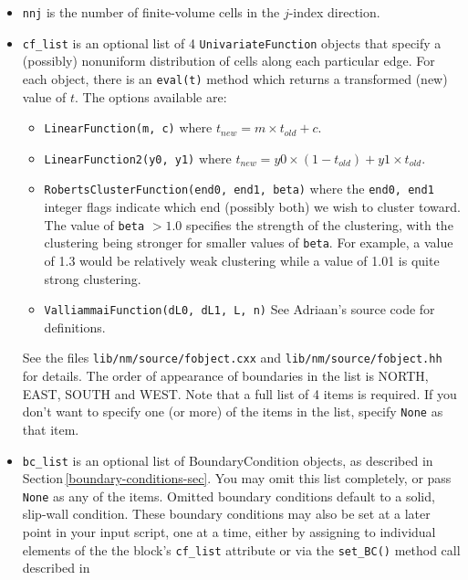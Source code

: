 \begin{itemize}
\item \texttt{nnj} is the number of finite-volume cells in the $j$-index direction.
\item \texttt{cf\_list} \label{cflist-item} is an optional list of 4 \texttt{UnivariateFunction} objects
  that specify a (possibly) nonuniform distribution of cells along each particular edge.
  For each object, there is an \texttt{eval(t)} method which returns a transformed (new) value of $t$.
  The options available are:
  \begin{itemize}
    \item \texttt{LinearFunction(m, c)}
      where $t_{new} = m \times t_{old} + c$.
    \item \texttt{LinearFunction2(y0, y1)}
      where $t_{new} = y0 \times (1-t_{old}) + y1 \times t_{old}$.
    \item \texttt{RobertsClusterFunction(end0, end1, beta)}
      where the \texttt{end0, end1} integer flags indicate which end (possibly both) we wish to cluster toward.
      The value of \texttt{beta} $> 1.0$ specifies the strength of the clustering, with the clustering
      being stronger for smaller values of \texttt{beta}.
      For example, a value of 1.3 would be relatively weak clustering while a value of 1.01 is quite strong
      clustering.
    \item \texttt{ValliammaiFunction(dL0, dL1, L, n)}
      See Adriaan's source code for definitions.
  \end{itemize}
  See the files \texttt{lib/nm/source/fobject.cxx} and \texttt{lib/nm/source/fobject.hh} for details.
  The order of appearance of boundaries in the list is NORTH, EAST, SOUTH and WEST.
  Note that a full list of 4 items is required.
  If you don't want to specify one (or more) of the items in the list, specify \texttt{None} as that item.
\item \texttt{bc\_list} is an optional list of BoundaryCondition objects,
  as described in Section\,\ref{boundary-conditions-sec}.
  You may omit this list completely, or pass \texttt{None} as any of the items.
  Omitted boundary conditions default to a solid, slip-wall condition.
  These boundary conditions may also be set at a later point in your input script,
  one at a time, either by assigning to individual elements of the the block's \texttt{cf\_list}
  attribute or via the \texttt{set\_BC()} method call described in 

\end{itemize}
